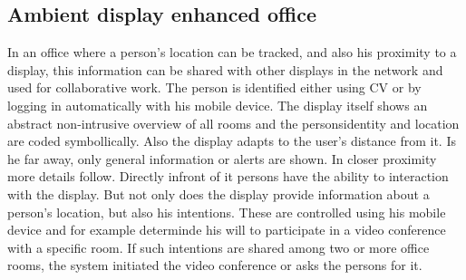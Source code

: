
\subsection{Ambient display enhanced office}
In an office where a person’s location can be tracked, and also his proximity to a display, this information can be shared with other displays in the network and used for collaborative work.
The person is identified either using CV or by logging in automatically with his mobile device.
The display itself shows an abstract non-intrusive overview of all rooms and the personsidentity and location are coded symbollically.
Also the display adapts to the user’s distance from it.
Is he far away, only general information or alerts are shown.
In closer proximity more details follow. Directly infront of it persons have the ability to interaction with the display.
But not only does the display provide information about a person’s location, but also his intentions.
These are controlled using his mobile device and for example determinde his will to participate in a video conference with a specific room.
If such intentions are shared among two or more office rooms, the system initiated the video conference or asks the persons for it.